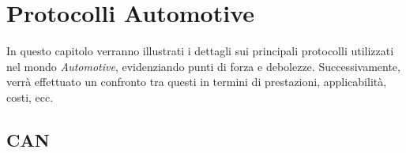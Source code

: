 \chapter{Protocolli Automotive} %
%

\begin{citazione}
In questo capitolo verranno illustrati i dettagli sui principali protocolli utilizzati nel mondo \emph{Automotive}, evidenziando punti di forza e debolezze. Successivamente, verrà effettuato un confronto tra questi in termini di prestazioni, applicabilità, costi, ecc.
\end{citazione}

\section{CAN}


